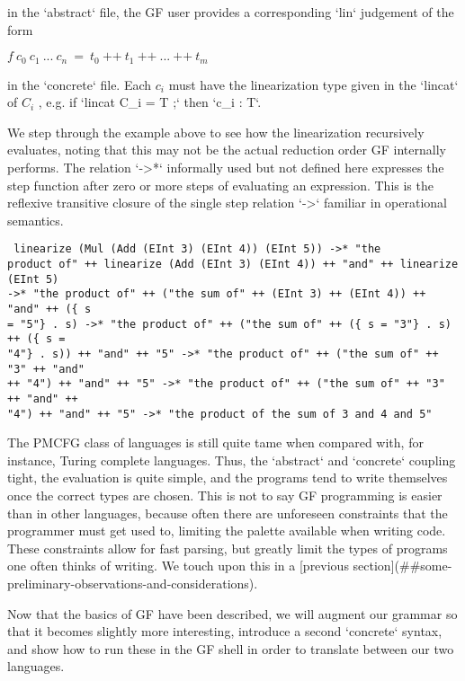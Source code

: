 \documentclass[11pt, a4paper]{article}
\begin{document}
in the `abstract` file, the GF user provides a corresponding `lin` judgement of
the form

  $f \: c_0 \: c_1 \: ... \: c_n \: {=} \: t_0 \: \texttt{++} \: t_1 \:
\texttt{++} \: ... \: \texttt{++} \: t_m $

in the `concrete` file. Each $c_i$ must have the linearization type given in the
`lincat` of $C_i$ , e.g. if `lincat C_i = T ;` then `c_i : T`.

We step through the example above to see how the linearization recursively
evaluates, noting that this may not be the actual reduction order GF internally
performs. The relation `->*` informally used but not defined here expresses the
step function after zero or more steps of evaluating an expression. This is the
reflexive transitive closure of the single step relation `->` familiar in
operational semantics.

\begin{verbatim} linearize (Mul (Add (EInt 3) (EInt 4)) (EInt 5)) ->* "the
product of" ++ linearize (Add (EInt 3) (EInt 4)) ++ "and" ++ linearize (EInt 5)
->* "the product of" ++ ("the sum of" ++ (EInt 3) ++ (EInt 4)) ++ "and" ++ ({ s
= "5"} . s) ->* "the product of" ++ ("the sum of" ++ ({ s = "3"} . s) ++ ({ s =
"4"} . s)) ++ "and" ++ "5" ->* "the product of" ++ ("the sum of" ++ "3" ++ "and"
++ "4") ++ "and" ++ "5" ->* "the product of" ++ ("the sum of" ++ "3" ++ "and" ++
"4") ++ "and" ++ "5" ->* "the product of the sum of 3 and 4 and 5"
\end{verbatim}

The PMCFG class of languages is still quite tame when compared with, for
instance, Turing complete languages. Thus, the `abstract` and `concrete`
coupling tight, the evaluation is quite simple, and the programs tend to write
themselves once the correct types are chosen. This is not to say GF programming
is easier than in other languages, because often there are unforeseen
constraints that the programmer must get used to, limiting the palette available
when writing code. These constraints allow for fast parsing, but greatly limit
the types of programs one often thinks of writing. We touch upon this in a
[previous section](##some-preliminary-observations-and-considerations).

Now that the basics of GF have been described, we will augment our grammar so
that it becomes slightly more interesting, introduce a second `concrete` syntax,
and show how to run these in the GF shell in order to translate between our two
languages.
\end{document}
